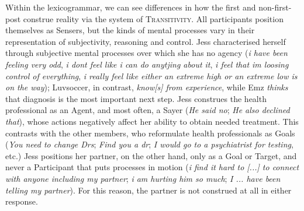 \documentclass{article}
\begin{document}
{Within the lexicogrammar, we can see differences in how the first and non-first-post construe reality via the system of \textsc{Transitivity}. All participants position themselves as Sensers, but the kinds of mental processes vary in their representation of subjectivity, reasoning and control. Jess characterised herself through subjective mental processes over which she has no agency (\emph{i have been feeling very odd}, \emph{i dont feel like i  can do anytjing about it}, \emph{i feel that im loosing control of everything}, \emph{i really feel like either an extreme high or an extreme low is on the way}); Luvsoccer, in contrast, \emph{know[s] from experience}, while Emz \emph{thinks} that diagnosis is the most important next step. Jess construes the health professional as an Agent, and most often, a Sayer (\emph{He said no}; \emph{He also declined that}), whose actions negatively affect her ability to obtain needed treatment. This contrasts with the other members, who reformulate health professionals as Goals (\emph{You need to change Drs}; \emph{Find you a dr}; \emph{I would go to a psychiatrist for testing}, etc.) Jess positions her partner, on the other hand, only as a Goal or Target, and never a Participant that puts processes in motion (\emph{i find it hard to [...] to connect with anyone including my partner}; \emph{i am hurting him so much}; \emph{I ... have been telling my partner}). For this reason, the partner is not construed at all in either response.


}
\end{document}
